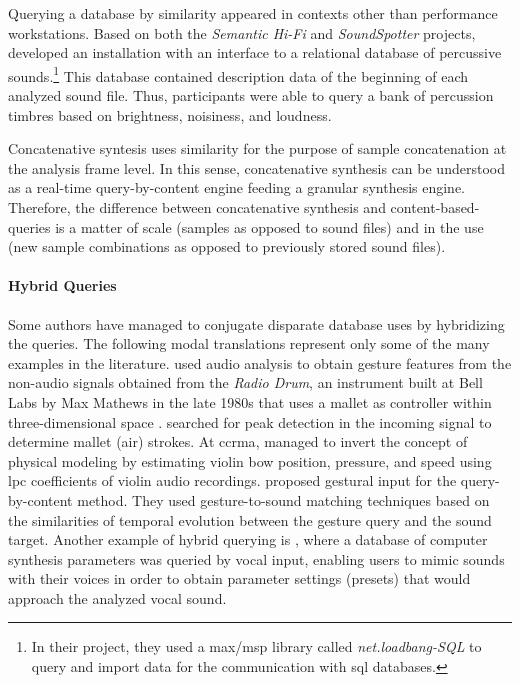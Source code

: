 {	Querying a database by similarity appeared in contexts other than performance workstations. Based on both the \textit{Semantic Hi-Fi} and \textit{SoundSpotter} projects, \textcite{Price2008} developed an installation with an interface to a relational database of percussive sounds.\footnote{In their project, they used a \gls{max/msp} library called \textit{net.loadbang-SQL} to query and import data for the communication with \gls{sql} databases.} This database contained description data of the beginning of each analyzed sound file. Thus, participants were able to query a bank of percussion timbres based on brightness, noisiness, and loudness. 

	Concatenative syntesis uses similarity for the purpose of sample concatenation at the analysis frame level. In this sense, concatenative synthesis can be understood as a real-time query-by-content engine feeding a granular synthesis engine. Therefore, the difference between concatenative synthesis and content-based-queries is a matter of scale (samples as opposed to sound files) and in the use (new sample combinations as opposed to previously stored sound files). 


	\paragraph{Hybrid Queries}
	Some authors have managed to conjugate disparate database uses by hybridizing the queries. The following modal translations represent only some of the many examples in the literature. \textcite{icmc/bbp2372.2001.103} used audio analysis to obtain gesture features from the non-audio signals obtained from the \textit{Radio Drum}, an instrument built at Bell Labs by Max Mathews in the late 1980s that uses a mallet as controller within three-dimensional space \parencite{DBLP:conf/icmc/Boie89}. \textcite{icmc/bbp2372.2001.103} searched for peak detection in the incoming signal to determine mallet (air) strokes. At \gls{ccrma}, \textcite{icmc/bbp2372.2001.071} managed to invert the concept of physical modeling by estimating violin bow position, pressure, and speed using \gls{lpc} coefficients of violin audio recordings. \textcite{Caramiaux2011} proposed gestural input for the query-by-content method. They used gesture-to-sound matching techniques based on the similarities of temporal evolution between the gesture query and the sound target. Another example of hybrid querying is \textcite{mcartwright:2014}, where a database of computer synthesis parameters was queried by vocal input, enabling users to mimic sounds with their voices in order to obtain parameter settings (presets) that would approach the analyzed vocal sound.	
}
